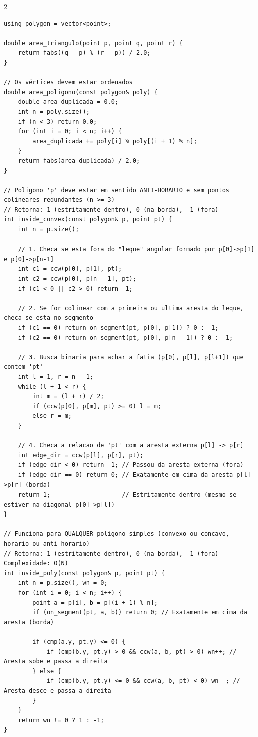 \documentclass[11pt]{article}
\begin{document}
\begin{multicols}{2}
\begin{lstlisting}
using polygon = vector<point>;

double area_triangulo(point p, point q, point r) {
    return fabs((q - p) % (r - p)) / 2.0;
}

// Os vértices devem estar ordenados
double area_poligono(const polygon& poly) {
    double area_duplicada = 0.0;
    int n = poly.size();
    if (n < 3) return 0.0;
    for (int i = 0; i < n; i++) {
        area_duplicada += poly[i] % poly[(i + 1) % n];
    }
    return fabs(area_duplicada) / 2.0;
}

// Poligono 'p' deve estar em sentido ANTI-HORARIO e sem pontos colineares redundantes (n >= 3)
// Retorna: 1 (estritamente dentro), 0 (na borda), -1 (fora)
int inside_convex(const polygon& p, point pt) {
    int n = p.size();
    
    // 1. Checa se esta fora do "leque" angular formado por p[0]->p[1] e p[0]->p[n-1]
    int c1 = ccw(p[0], p[1], pt);
    int c2 = ccw(p[0], p[n - 1], pt);
    if (c1 < 0 || c2 > 0) return -1;

    // 2. Se for colinear com a primeira ou ultima aresta do leque, checa se esta no segmento
    if (c1 == 0) return on_segment(pt, p[0], p[1]) ? 0 : -1;
    if (c2 == 0) return on_segment(pt, p[0], p[n - 1]) ? 0 : -1;

    // 3. Busca binaria para achar a fatia (p[0], p[l], p[l+1]) que contem 'pt'
    int l = 1, r = n - 1;
    while (l + 1 < r) {
        int m = (l + r) / 2;
        if (ccw(p[0], p[m], pt) >= 0) l = m;
        else r = m;
    }

    // 4. Checa a relacao de 'pt' com a aresta externa p[l] -> p[r]
    int edge_dir = ccw(p[l], p[r], pt);
    if (edge_dir < 0) return -1; // Passou da aresta externa (fora)
    if (edge_dir == 0) return 0; // Exatamente em cima da aresta p[l]->p[r] (borda)
    return 1;                    // Estritamente dentro (mesmo se estiver na diagonal p[0]->p[l])
}

// Funciona para QUALQUER poligono simples (convexo ou concavo, horario ou anti-horario)
// Retorna: 1 (estritamente dentro), 0 (na borda), -1 (fora) — Complexidade: O(N)
int inside_poly(const polygon& p, point pt) {
    int n = p.size(), wn = 0;
    for (int i = 0; i < n; i++) {
        point a = p[i], b = p[(i + 1) % n];
        if (on_segment(pt, a, b)) return 0; // Exatamente em cima da aresta (borda)
        
        if (cmp(a.y, pt.y) <= 0) {
            if (cmp(b.y, pt.y) > 0 && ccw(a, b, pt) > 0) wn++; // Aresta sobe e passa a direita
        } else {
            if (cmp(b.y, pt.y) <= 0 && ccw(a, b, pt) < 0) wn--; // Aresta desce e passa a direita
        }
    }
    return wn != 0 ? 1 : -1;
}


\end{lstlisting}
\end{multicols}
\end{document}
